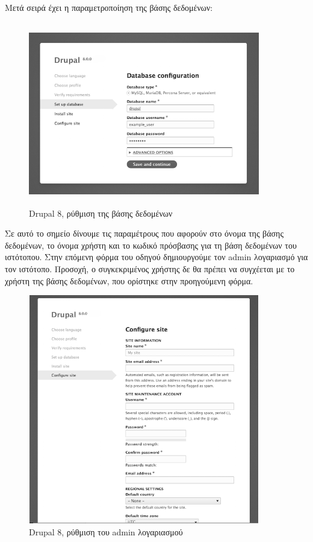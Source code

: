 \documentclass[12pt]{report}
\begin{document}
Μετά σειρά έχει η παραμετροποίηση της βάσης δεδομένων:
\begin{figure}[H]
\centering
\includegraphics[width=0.9\textwidth, height=8cm]{drupal-database-configuration-gray}
\caption{\textlatin{Drupal 8}, ρύθμιση της βάσης δεδομένων}
\label{fig:drupal_db}
\end{figure}

Σε αυτό το σημείο δίνουμε τις παραμέτρους που αφορούν στο όνομα της βάσης δεδομένων, το όνομα χρήστη και το κωδικό πρόσβασης για τη βάση δεδομένων του ιστότοπου. Στην επόμενη φόρμα του οδηγού δημιουργούμε τον \textlatin{admin} λογαριασμό για τον ιστότοπο. Προσοχή, ο συγκεκριμένος χρήστης δε θα πρέπει να συγχέεται με το χρήστη της βάσης δεδομένων, που ορίστηκε στην προηγούμενη φόρμα.
\begin{figure}[H]
\centering
\includegraphics[width=0.9\textwidth, height=10cm]{drupal-site-configuration-gray}
\caption{\textlatin{Drupal 8}, ρύθμιση του \textlatin{admin} λογαριασμού}
\label{fig:drupal_admin}
\end{figure}
\end{document}
